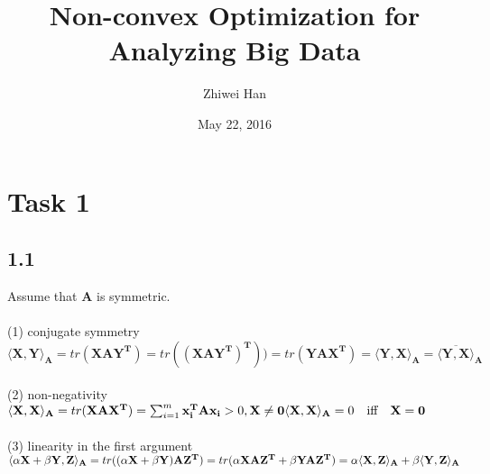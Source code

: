 \documentclass[12pt,a4paper,titlepage]{article}
\begin{document}
\title{\textbf{Non-convex Optimization for Analyzing Big Data}\\
\medskip
{}}

\author{Zhiwei Han}
\date{May 22, 2016}
\maketitle


\setlength{\parindent}{0pt} \setlength{\parskip}{2ex plus 0.5ex
minus 0.2ex}


\section*{Task 1}

\subsection*{1.1}
Assume that $\mathbf{A}$ is symmetric.\\\\
(1) conjugate symmetry\\
$ \langle\mathbf{X},\mathbf{Y}\rangle_\mathbf{A} 
 = tr(\mathbf{XAY^T})
 = tr((\mathbf{XAY^T})^\mathbf{T}))
 = tr(\mathbf{YAX^T})
 = \langle\mathbf{Y,X}\rangle_\mathbf{A}
 = \overline{\langle\mathbf{Y,X}\rangle}_\mathbf{A}$\\\\
(2) non-negativity\\
$ \langle\mathbf{X},\mathbf{X}\rangle_\mathbf{A}
 = tr(\mathbf{XAX^T})
 = \sum_{i=1}^{m}\mathbf{x_i^{T}Ax_i} > 0, \mathbf{X \neq 0}\\
  \langle\mathbf{X,X}\rangle_\mathbf{A}
 = 0 \quad \text{iff}\quad \mathbf{X=0}$\\\\
(3) linearity in the first argument\\
$ \langle\mathbf{\alpha X+\beta Y,Z}\rangle_\mathbf{A}
 = tr((\mathbf{\alpha X+\beta Y)AZ^T})
 = tr(\mathbf{\alpha XAZ^T+\beta YAZ^T})\\
 =\alpha\langle\mathbf{X,Z}\rangle_\mathbf{A}+\beta\langle\mathbf{Y,Z}\rangle_\mathbf{A}$\\\\
\end{document}
